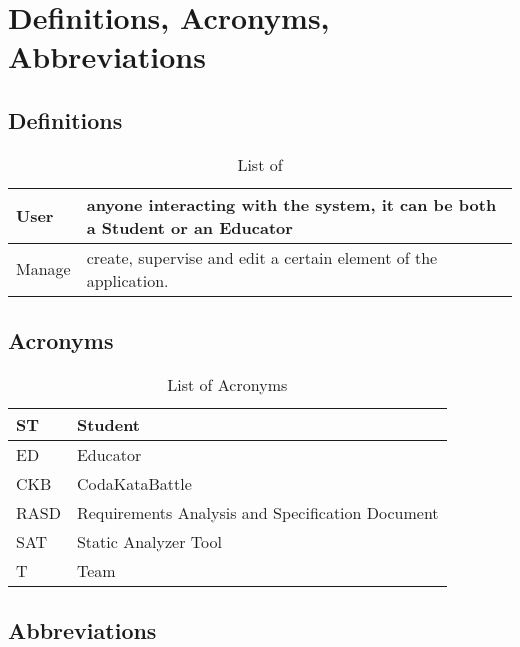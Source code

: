 \section{Definitions, Acronyms, Abbreviations}
\label{s:Definitions_Acronyms_Abbreviations}%

\subsection{Definitions}
\label{ss:Definitions}

\begin{table}[H]
  \begin{tabular}{|l|l|}

    \hline
    User & anyone interacting with the system, it can be both a Student or an Educator    \\
    \hline
    Manage & create, supervise and edit a certain element of the application. \\
    \hline
  \end{tabular}
  \caption{List of }
  \label{tab:definitions}
\end{table}

\subsection{Acronyms}
\label{ss:Acronyms}

\begin{table}[H]
  \begin{tabular}{|l|l|}

    \hline
    ST & Student \\
    \hline
    ED & Educator \\
    \hline
    CKB & CodaKataBattle \\
    \hline
    RASD & Requirements Analysis and Specification Document     \\
    \hline
    SAT & Static Analyzer Tool    \\
    \hline
    T & Team    \\
    \hline
  \end{tabular}
  \caption{List of Acronyms}
  \label{tab:acronyms}
\end{table}

\subsection{Abbreviations}
\label{ss:Abbreviations}


